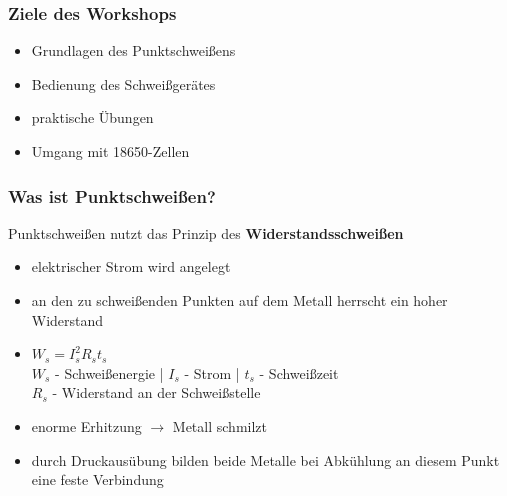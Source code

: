 \documentclass[handout, usenames,dvipsnames, nosymbols,aspectratio=169]{beamer}
\begin{document}
	\addtocounter{framenumber}{-1}	%
	\titlepage
	
	\begin{frame}
		\frametitle{Ziele des Workshops}
		\begin{itemize}[<+->]
			\item Grundlagen des Punktschweißens
			\item Bedienung des Schweißgerätes
			\item praktische Übungen
			\item Umgang mit 18650-Zellen
		\end{itemize}
	\end{frame}
	
	\begin{frame}
		\frametitle{Was ist Punktschweißen?}
		Punktschweißen nutzt das Prinzip des \textbf{Widerstandsschweißen}\\[0.5em]
		\begin{minipage}{0.65\textwidth}	
			\begin{itemize}[<+->]
				\item elektrischer Strom wird angelegt
				\item an den zu schweißenden Punkten auf dem Metall herrscht ein hoher Widerstand
				\item  ${W_{s} = I^{2}_{s}R_{s}t_{s}}$\\
				\color{gray}
				$W_{s}$ - Schweißenergie | $I_{s}$ - Strom | $t_{s}$ - Schweißzeit\\
				$R_{s}$ - Widerstand an der Schweißstelle\\
				\normalcolor
				\item enorme Erhitzung $\rightarrow$ Metall schmilzt
				\item durch Druckausübung bilden beide Metalle bei Abkühlung an diesem Punkt eine feste Verbindung
			\end{itemize}
		\end{minipage}
		\begin{minipage}{0.3\textwidth}

\end{minipage}
\end{frame}
\end{document}
